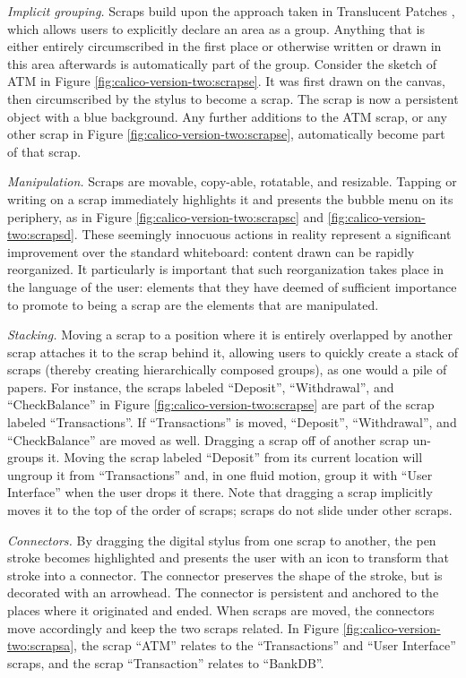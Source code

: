 \emph{Implicit grouping.} Scraps build upon the approach taken in Translucent Patches \cite{Kramer}, which allows users to explicitly declare an area as a group. Anything that is either entirely circumscribed in the first place or otherwise written or drawn in this area afterwards is automatically part of the group. Consider the sketch of ATM in Figure \ref{fig:calico-version-two:scrapse}. It was first drawn on the canvas, then circumscribed by the stylus to become a scrap. The scrap is now a persistent object with a blue background. Any further additions to the ATM scrap, or any other scrap in Figure \ref{fig:calico-version-two:scrapse}, automatically become part of that scrap.

\emph{Manipulation.} Scraps are movable, copy-able, rotatable, and resizable. Tapping or writing on a scrap immediately highlights it and presents the bubble menu on its periphery, as in Figure \ref{fig:calico-version-two:scrapsc} and \ref{fig:calico-version-two:scrapsd}. These seemingly innocuous actions in reality represent a significant improvement over the standard whiteboard: content drawn can be rapidly reorganized. It particularly is important that such reorganization takes place in the language of the user: elements that they have deemed of sufficient importance to promote to being a scrap are the elements that are manipulated.

\emph{Stacking.} Moving a scrap to a position where it is entirely overlapped by another scrap attaches it to the scrap behind it, allowing users to quickly create a stack of scraps (thereby creating hierarchically composed groups), as one would a pile of papers. For instance, the scraps labeled ``Deposit'', ``Withdrawal'', and ``CheckBalance'' in Figure \ref{fig:calico-version-two:scrapse} are part of the scrap labeled ``Transactions''. If ``Transactions'' is moved, ``Deposit'', ``Withdrawal'', and ``CheckBalance'' are moved as well. Dragging a scrap off of another scrap un-groups it. Moving the scrap labeled ``Deposit'' from its current location will ungroup it from ``Transactions'' and, in one fluid motion, group it with ``User Interface'' when the user drops it there. Note that dragging a scrap implicitly moves it to the top of the order of scraps; scraps do not slide under other scraps.

\emph{Connectors.} By dragging the digital stylus from one scrap to another, the pen stroke becomes highlighted and presents the user with an icon to transform that stroke into a connector. The connector preserves the shape of the stroke, but is decorated with an arrowhead. The connector is persistent and anchored to the places where it originated and ended. When scraps are moved, the connectors move accordingly and keep the two scraps related. In Figure \ref{fig:calico-version-two:scrapsa}, the scrap ``ATM'' relates to the ``Transactions'' and ``User Interface'' scraps, and the scrap ``Transaction'' relates to ``BankDB''.

